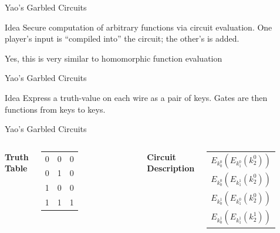 \documentclass[12pt]{beamer}
\begin{document}
\begin{frame}{Yao's Garbled Circuits}
	\begin{block}{Idea}
		Secure computation of arbitrary functions via circuit evaluation. One
		player's input is ``compiled into'' the circuit; the other's is added.
	\end{block}

	\begin{exampleblock}{}
		Yes, this is very similar to homomorphic function evaluation
	\end{exampleblock}
\end{frame}

\begin{frame}{Yao's Garbled Circuits}
	\centering
	\begin{block}{Idea}
		Express a truth-value on each wire as a pair of keys. Gates are then
		functions from keys to keys.
	\end{block}

\end{frame}

\begin{frame}{Yao's Garbled Circuits}

	\begin{columns}

		\textbf{Truth Table} \\
		\begin{tabular}{cc|c}
			0 & 0 & 0 \\
			0 & 1 & 0 \\
			1 & 0 & 0 \\
			1 & 1 & 1
		\end{tabular}

		\textbf{Circuit Description} \\
		\begin{tabular}{c}
			$E_{k_0^0}(E_{k_1^0}(k_2^0))$ \\
			$E_{k_0^0}(E_{k_1^1}(k_2^0))$ \\
			$E_{k_0^1}(E_{k_1^0}(k_2^0))$ \\
			$E_{k_0^1}(E_{k_1^1}(k_2^1))$
		\end{tabular}
	\end{columns}
\end{frame}
\end{document}
